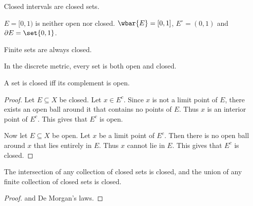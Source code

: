 \begin{examples}
    \item Closed intervals are closed sets.
    \item $E = [0, 1)$ is neither open nor closed.
    $\wbar{E} = [0, 1]$, $E^\circ = (0, 1)$ and $\partial E = \set{0, 1}$.
    \item Finite sets are always closed.
    \item In the discrete metric, every set is both open and closed.
\end{examples}
\begin{proposition} \label{thm:closed:open}
    A set is closed iff its complement is open.
\end{proposition}
\begin{proof}
    Let $E \subseteq X$ be closed.
    Let $x \in E^c$.
    Since $x$ is not a limit point of $E$, there exists an open ball
    around it that contains no points of $E$.
    Thus $x$ is an interior point of $E^c$.
    This gives that $E^c$ is open.

    Now let $E \subseteq X$ be open.
    Let $x$ be a limit point of $E^c$.
    Then there is no open ball around $x$ that lies entirely in $E$.
    Thus $x$ cannot lie in $E$.
    This gives that $E^c$ is closed.
\end{proof}
\begin{corollary} \label{thm:closed_intersection}
    The intersection of any collection of closed sets is closed,
    and the union of any finite collection of closed sets is closed.
\end{corollary}
\begin{proof}
     and De Morgan's laws.
\end{proof}

